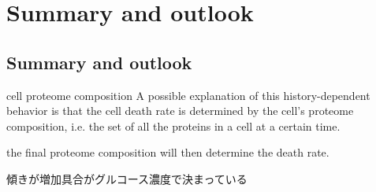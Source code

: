 \chapter{Summary and outlook}
\section{Summary and outlook}
cell proteome composition
A possible explanation of this history-dependent behavior is that the cell death rate is determined by the cell’s proteome composition, i.e. the set of all the proteins in a cell at a certain time.

the final proteome composition will then determine the death rate.

傾きが増加具合がグルコース濃度で決まっている



